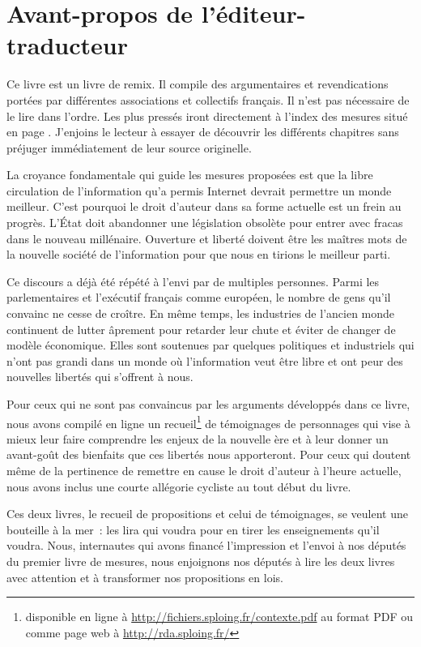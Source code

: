 \chapter*{Avant-propos de l'éditeur-traducteur}

Ce livre est un livre de remix. Il compile des argumentaires et revendications portées par différentes associations et collectifs français. Il n'est pas nécessaire de le lire dans l'ordre. Les plus pressés iront directement à l'index des mesures situé en page \pageref{index}. J'enjoins le lecteur à essayer de découvrir les différents chapitres sans préjuger immédiatement de leur source originelle.

La croyance fondamentale qui guide les mesures proposées est que la libre circulation de l'information qu'a permis Internet devrait permettre un monde meilleur. C'est pourquoi le droit d'auteur dans sa forme actuelle est un frein au progrès. L'État doit abandonner une législation obsolète pour entrer avec fracas dans le nouveau millénaire. Ouverture et liberté doivent être les maîtres mots de la nouvelle société de l'information pour que nous en tirions le meilleur parti. 

Ce discours a déjà été répété à l'envi par de multiples personnes. Parmi les parlementaires et l'exécutif français comme européen, le nombre de gens qu'il convainc ne cesse de croître. En même temps, les industries de l'ancien monde continuent de lutter âprement pour retarder leur chute et éviter de changer de modèle économique. Elles sont soutenues par quelques politiques et industriels qui n'ont pas grandi dans un monde où l'information veut être libre et ont peur des nouvelles libertés qui s'offrent à nous. 

Pour ceux qui ne sont pas convaincus par les arguments développés dans ce livre, nous avons compilé en ligne un recueil\footnote{disponible en ligne à \url{http://fichiers.sploing.fr/contexte.pdf} au format PDF ou comme page web à \url{http://rda.sploing.fr/}} de témoignages de personnages qui vise à mieux leur faire comprendre les enjeux de la nouvelle ère et à leur donner un avant-goût des bienfaits que ces libertés nous apporteront. Pour ceux qui doutent même de la pertinence de remettre en cause le droit d'auteur à l'heure actuelle, nous avons inclus une courte allégorie cycliste au tout début du livre.

Ces deux livres, le recueil de propositions et celui de témoignages, se veulent une bouteille à la mer~: les lira qui voudra pour en tirer les enseignements qu'il voudra. Nous, internautes qui avons financé l'impression et l'envoi à nos députés du premier livre de mesures, nous enjoignons nos députés à lire les deux livres avec attention et à transformer nos propositions en lois. 
